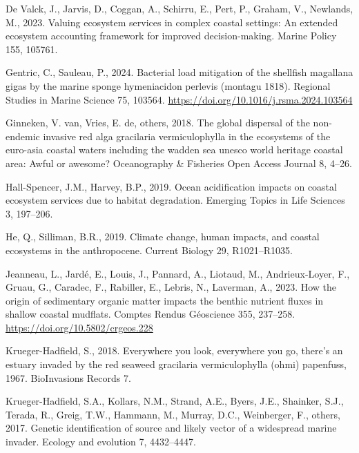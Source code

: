 \documentclass[
  letterpaper,
  DIV=11,
  numbers=noendperiod]{scrartcl}
\newlength{\cslhangindent}
\newenvironment{CSLReferences}[2] %
 {\begin{list}{}{%
  \setlength{\itemindent}{0pt}
  \setlength{\leftmargin}{0pt}
  \setlength{\parsep}{0pt}
  \ifodd #1
   \setlength{\leftmargin}{\cslhangindent}
   \setlength{\itemindent}{-1\cslhangindent}
  \fi
  \setlength{\itemsep}{#2\baselineskip}}}
 {\end{list}}
\begin{document}
\begin{CSLReferences}{1}{0}
De Valck, J., Jarvis, D., Coggan, A., Schirru, E., Pert, P., Graham, V.,
Newlands, M., 2023. Valuing ecosystem services in complex coastal
settings: An extended ecosystem accounting framework for improved
decision-making. Marine Policy 155, 105761.

Gentric, C., Sauleau, P., 2024. Bacterial load mitigation of the
shellfish magallana gigas by the marine sponge hymeniacidon perlevis
(montagu 1818). Regional Studies in Marine Science 75, 103564.
\url{https://doi.org/10.1016/j.rsma.2024.103564}

Ginneken, V. van, Vries, E. de, others, 2018. The global dispersal of
the non-endemic invasive red alga gracilaria vermiculophylla in the
ecosystems of the euro-asia coastal waters including the wadden sea
unesco world heritage coastal area: Awful or awesome? Oceanography \&
Fisheries Open Access Journal 8, 4--26.

Hall-Spencer, J.M., Harvey, B.P., 2019. Ocean acidification impacts on
coastal ecosystem services due to habitat degradation. Emerging Topics
in Life Sciences 3, 197--206.

He, Q., Silliman, B.R., 2019. Climate change, human impacts, and coastal
ecosystems in the anthropocene. Current Biology 29, R1021--R1035.

Jeanneau, L., Jardé, E., Louis, J., Pannard, A., Liotaud, M.,
Andrieux-Loyer, F., Gruau, G., Caradec, F., Rabiller, E., Lebris, N.,
Laverman, A., 2023. How the origin of sedimentary organic matter impacts
the benthic nutrient fluxes in shallow coastal mudflats. Comptes Rendus
Géoscience 355, 237--258. \url{https://doi.org/10.5802/crgeos.228}

Krueger-Hadfield, S., 2018. Everywhere you look, everywhere you go,
there's an estuary invaded by the red seaweed gracilaria vermiculophylla
(ohmi) papenfuss, 1967. BioInvasions Records 7.

Krueger-Hadfield, S.A., Kollars, N.M., Strand, A.E., Byers, J.E.,
Shainker, S.J., Terada, R., Greig, T.W., Hammann, M., Murray, D.C.,
Weinberger, F., others, 2017. Genetic identification of source and
likely vector of a widespread marine invader. Ecology and evolution 7,
4432--4447.


\end{CSLReferences}
\end{document}
